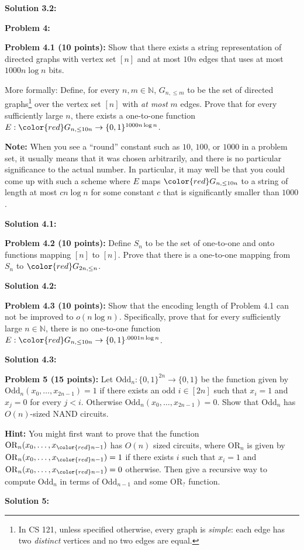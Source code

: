 \documentclass[11pt]{article}
\begin{document}
\textbf{Solution 3.2:} %



\textbf{Problem 4:}

\newcommand{\N}{\mathbb{N}}

\textbf{Problem 4.1 (10 points):}
Show that there exists a string
representation of directed graphs with vertex set $[n]$ and at most
 $10n$ edges that uses at most $1000n \log n$ bits.

More formally: Define, for every $n,m \in \N$, $G_{n,\le m}$ to be the set of directed graphs\footnote{In CS 121, unless specified otherwise, every graph is \emph{simple}: each edge has two \emph{distinct} vertices and no two edges are equal.} over the vertex
set $[n]$ with {\em at most} $m$ edges. Prove that for
every sufficiently large $n$, there exists a one-to-one function $E:{\color{red}G_{n, \leq 10n}} \to \{0,1\}^{1000n\log n}$.

\textbf{Note:} When you see a ``round'' constant such as \(10\),
\(100\), or \(1000\) in a problem set, it usually means that it was
chosen arbitrarily, and there is no particular significance to the
actual number. In particular, it may well be that you could come up with
such a scheme where \(E\) maps \({\color{red}G_{n, \leq 10n}}\) to a string of
length at most \(cn\log n\) for some constant \(c\) that is significantly
smaller than \(1000\).

\textbf{Solution 4.1:} %

\textbf{Problem 4.2 (10 points):}  Define $S_n$ to be the
set of one-to-one and onto functions mapping $[n]$ to $[n]$.
Prove that there is a one-to-one mapping from $S_n$ to ${\color{red}G_{2n,\leq n}}$.

\textbf{Solution 4.2:} %

\textbf{Problem 4.3 (10 points):}
Show that the encoding length of Problem 4.1 can not be improved to $o(n \log n)$. Specifically, prove that
for every sufficiently large $n\in\N$, there is no one-to-one function
$E:{\color{red} G_{n, \leq 10n}} \to \{0,1\}^{.0001 n \log n}$.

\textbf{Solution 4.3:} %

\newcommand{\Odd}{\mathrm{Odd}}
\newcommand{\OR}{\mathrm{OR}}


\textbf{Problem 5 (15 points):}
Let $\Odd_n:\{0,1\}^{2n} \to \{0,1\}$ be the function given by $\Odd_n(x_0,\ldots,x_{2n-1}) = 1$ if there exists an odd $i \in [2n]$ such that $x_i = 1$ and $x_j = 0$ for every $j <i$. Otherwise $\Odd_n(x_0,\ldots,x_{2n-1}) = 0$. Show that $\Odd_n$ has $O(n)$-sized NAND circuits. 

\textbf{Hint:} You might first want to prove that the function $\OR_n(x_0,\ldots,x_{\color{red} n-1})$ has $O(n)$ sized circuits, where $\OR_n$ is given by $\OR_n(x_0,\ldots,x_{\color{red} n-1})=1$ if there exists $i$ such that $x_i = 1$ and $\OR_n(x_0,\ldots,x_{\color{red} n-1})=0$ otherwise. Then give a recursive way to compute $\Odd_n$ in terms of $\Odd_{n-1}$ and some $\OR_?$ function.

\textbf{Solution 5:} %
\end{document}
